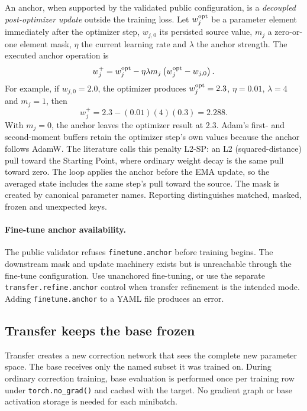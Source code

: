 \documentclass[10pt,aps,prd,twocolumn,nofootinbib]{revtex4-2}
\newcommand{\code}[1]{\texttt{#1}}
\begin{document}
An anchor, when supported by the validated public configuration, is a
\emph{decoupled post-optimizer update} outside the training loss.  Let
$w_j^{\rm opt}$ be a parameter element immediately
after the optimizer step, $w_{j,0}$ its persisted source value, $m_j$ a
zero-or-one element mask, $\eta$ the current learning rate and $\lambda$ the
anchor strength.  The executed anchor operation is
\begin{equation*}
 w_j^{+}=w_j^{\rm opt}
 -\eta\lambda m_j
  \left(w_j^{\rm opt}-w_{j,0}\right).
\end{equation*}
For example, if $w_{j,0}=2.0$, the optimizer produces
$w_j^{\rm opt}=2.3$, $\eta=0.01$, $\lambda=4$ and $m_j=1$, then
\begin{equation*}
 w_j^{+}=2.3-(0.01)(4)(0.3)=2.288.
\end{equation*}
With $m_j=0$, the anchor leaves the optimizer result at 2.3.  Adam's first-
and second-moment buffers retain the optimizer step's own values because the
anchor follows AdamW.  The literature calls this penalty L2-SP: an L2
(squared-distance) pull toward the Starting Point, where ordinary weight
decay is the same pull toward zero.  The loop applies the anchor before the
EMA update, so the averaged state includes the same step's pull toward the
source.  The mask is created by canonical parameter names.  Reporting
distinguishes matched, masked, frozen and unexpected keys.

\paragraph{Fine-tune anchor availability.}
The public validator refuses \code{finetune.anchor} before training begins.
The downstream mask and update machinery exists but is unreachable through
the fine-tune configuration.  Use unanchored fine-tuning, or use the separate
\code{transfer.refine.anchor} control when transfer refinement is the intended
mode.  Adding \code{finetune.anchor} to a YAML file produces an error.

\subsection{Transfer keeps the base frozen}

Transfer creates a new correction network that sees the complete new
parameter space.  The base receives only the named subset it was trained on.
During ordinary correction training, base evaluation is performed once per
training row under \code{torch.no\_grad()} and cached with the target.  No
gradient graph or base activation storage is needed for each minibatch.
\end{document}
